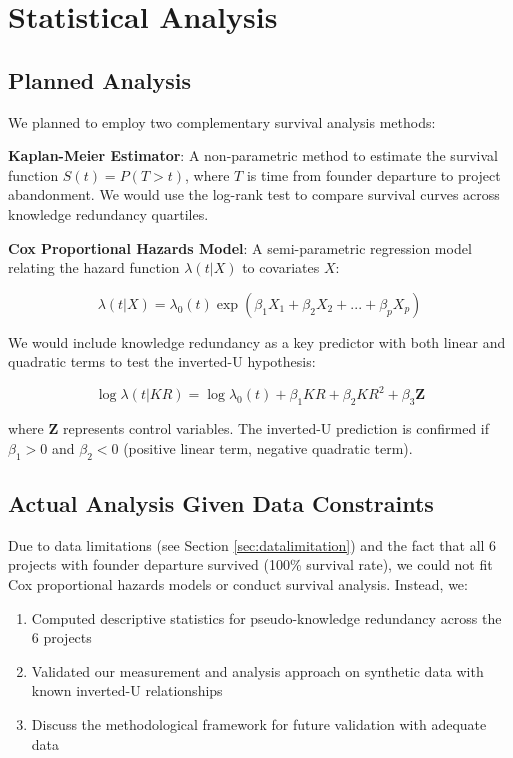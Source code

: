 \documentclass[11pt,letterpaper]{article}
\begin{document}
\section{Statistical Analysis}

\subsection{Planned Analysis}

We planned to employ two complementary survival analysis methods:

\textbf{Kaplan-Meier Estimator}: A non-parametric method to estimate the survival function $S(t) = P(T > t)$, where $T$ is time from founder departure to project abandonment. We would use the log-rank test to compare survival curves across knowledge redundancy quartiles.

\textbf{Cox Proportional Hazards Model}: A semi-parametric regression model relating the hazard function $\lambda(t|X)$ to covariates $X$:

\begin{equation}
    \lambda(t|X) = \lambda_0(t) \exp(\beta_1 X_1 + \beta_2 X_2 + ... + \beta_p X_p)
\end{equation}

We would include knowledge redundancy as a key predictor with both linear and quadratic terms to test the inverted-U hypothesis:

\begin{equation}
    \log \lambda(t|KR) = \log \lambda_0(t) + \beta_1 KR + \beta_2 KR^2 + \beta_3 \mathbf{Z}
\end{equation}

where $\mathbf{Z}$ represents control variables. The inverted-U prediction is confirmed if $\beta_1 > 0$ and $\beta_2 < 0$ (positive linear term, negative quadratic term).

\subsection{Actual Analysis Given Data Constraints}

Due to data limitations (see Section \ref{sec:datalimitation}) and the fact that all 6 projects with founder departure survived (100\% survival rate), we could not fit Cox proportional hazards models or conduct survival analysis. Instead, we:

\begin{enumerate}
    \item Computed descriptive statistics for pseudo-knowledge redundancy across the 6 projects
    \item Validated our measurement and analysis approach on synthetic data with known inverted-U relationships
    \item Discuss the methodological framework for future validation with adequate data
\end{enumerate}
\end{document}
